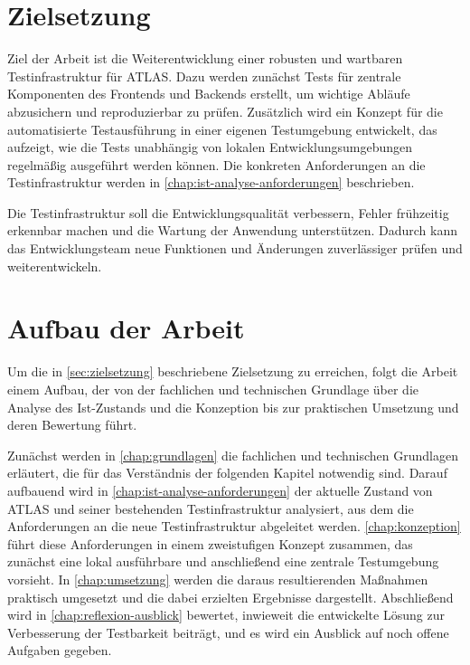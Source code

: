 \section{Zielsetzung}
\label{sec:zielsetzung}
Ziel der Arbeit ist die Weiterentwicklung einer robusten und wartbaren Testinfrastruktur für \ac{ATLAS}. Dazu werden zunächst Tests für zentrale Komponenten des Frontends und Backends erstellt, um wichtige Abläufe abzusichern und reproduzierbar zu prüfen. Zusätzlich wird ein Konzept für die automatisierte Testausführung in einer eigenen Testumgebung entwickelt, das aufzeigt, wie die Tests unabhängig von lokalen Entwicklungsumgebungen regelmäßig ausgeführt werden können. Die konkreten Anforderungen an die Testinfrastruktur werden in \autoref{chap:ist-analyse-anforderungen} beschrieben.

Die Testinfrastruktur soll die Entwicklungsqualität verbessern, Fehler frühzeitig erkennbar machen und die Wartung der Anwendung unterstützen. Dadurch kann das Entwicklungsteam neue Funktionen und Änderungen zuverlässiger prüfen und weiterentwickeln.

\section{Aufbau der Arbeit}
Um die in \autoref{sec:zielsetzung} beschriebene Zielsetzung zu erreichen, folgt die Arbeit einem Aufbau, der von der fachlichen und technischen Grundlage über die Analyse des Ist-Zustands und die Konzeption bis zur praktischen Umsetzung und deren Bewertung führt.

Zunächst werden in \autoref{chap:grundlagen} die fachlichen und technischen Grundlagen erläutert, die für das Verständnis der folgenden Kapitel notwendig sind. Darauf aufbauend wird in \autoref{chap:ist-analyse-anforderungen} der aktuelle Zustand von \ac{ATLAS} und seiner bestehenden Testinfrastruktur analysiert, aus dem die Anforderungen an die neue Testinfrastruktur abgeleitet werden. \autoref{chap:konzeption} führt diese Anforderungen in einem zweistufigen Konzept zusammen, das zunächst eine lokal ausführbare und anschließend eine zentrale Testumgebung vorsieht. In \autoref{chap:umsetzung} werden die daraus resultierenden Maßnahmen praktisch umgesetzt und die dabei erzielten Ergebnisse dargestellt. Abschließend wird in \autoref{chap:reflexion-ausblick} bewertet, inwieweit die entwickelte Lösung zur Verbesserung der Testbarkeit beiträgt, und es wird ein Ausblick auf noch offene Aufgaben gegeben.